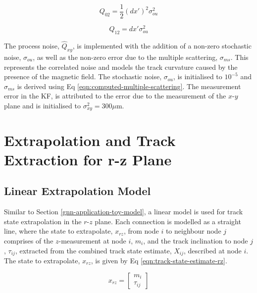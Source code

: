\begin{equation}
Q_{02} = \frac{1}{2} (dx')^2 \sigma_{ou}^{2}
\label{eqn:q02}
\end{equation}

\begin{equation}
Q_{12} = dx' \sigma_{ou}^{2}
\label{eqn:q12}
\end{equation}

The process noise, $\hat{Q}_{xy}$, is implemented with the addition of a non-zero stochastic noise, $\sigma_{ou}$, as well as the non-zero error due to the multiple scattering, $\sigma_{ms}$. This represents the correlated noise and models the track curvature caused by the presence of the magnetic field. The stochastic noise, $\sigma_{ou}$, is initialised to $10^{-5}$ and $\sigma_{ms}$ is derived using Eq \eqref{eqn:computed-multiple-scattering}. The measurement error in the KF, is attributed to the error due to the measurement of the $x$-$y$ plane and is initialised to $\sigma_{xy}^{2} = 300\mu$m.
















\section{Extrapolation and Track Extraction for r-z Plane}
\label{chapter-6-r-z-plane-impl}

\subsection{Linear Extrapolation Model}


Similar to Section \ref{gnn-application-toy-model}, a linear model is used for track state extrapolation in the $r$-$z$ plane. Each connection is modelled as a straight line, where the state to extrapolate, $x_{rz}$, from node $i$ to neighbour node $j$ comprises of the $z$-measurement at node $i$, $m_i$, and the track inclination to node $j$, $\tau_{ij}$, extracted from the combined track state estimate, $X_{ij}$, described at node $i$. The state to extrapolate, $x_{rz}$, is given by Eq \eqref{eqn:track-state-estimate-rz}.

\begin{equation}
x_{rz} = \begin{bmatrix} m_i \\ \tau_{ij} \end{bmatrix}
\label{eqn:track-state-estimate-rz}
\end{equation}



